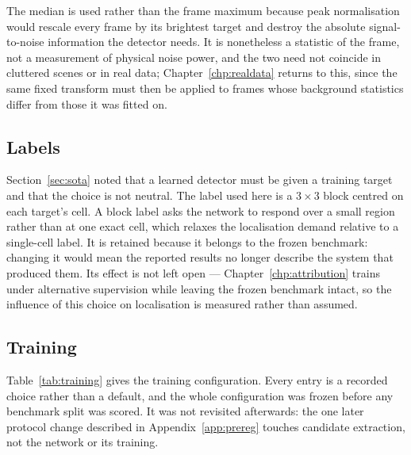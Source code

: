 The median is used rather than the frame maximum because peak normalisation would rescale every
frame by its brightest target and destroy the absolute signal-to-noise information the detector
needs. It is nonetheless a statistic of the frame, not a measurement of physical noise power, and the
two need not coincide in cluttered scenes or in real data; Chapter~\ref{chp:realdata} returns to this,
since the same fixed transform must then be applied to frames whose background statistics differ from
those it was fitted on.

\subsection{Labels}
\label{sec:labels}

Section~\ref{sec:sota} noted that a learned detector must be given a training target and that the
choice is not neutral. The label used here is a $3\times3$ block centred on each target's cell. A
block label asks the network to respond over a small region rather than at one exact cell, which
relaxes the localisation demand relative to a single-cell label. It is retained because it belongs to
the frozen benchmark: changing it would mean the reported results no longer describe the system that
produced them. Its effect is not left open --- Chapter~\ref{chp:attribution} trains under alternative
supervision while leaving the frozen benchmark intact, so the influence of this choice on
localisation is measured rather than assumed.

\subsection{Training}

Table~\ref{tab:training} gives the training configuration. Every entry is a recorded choice rather
than a default, and the whole configuration was frozen before any benchmark split was scored. It was
not revisited afterwards: the one later protocol change described in Appendix~\ref{app:prereg}
touches candidate extraction, not the network or its training.

